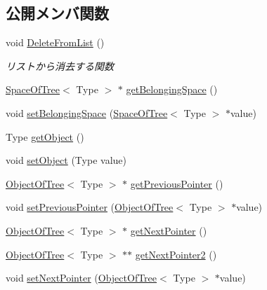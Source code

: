 \subsection*{公開メンバ関数}
\begin{DoxyCompactItemize}
\item 
void \mbox{\hyperlink{class_object_of_tree_a1356595b29749ca4555ca61a5bb30388}{Delete\+From\+List}} ()
\begin{DoxyCompactList}\small\item\em リストから消去する関数 \end{DoxyCompactList}\item 
\mbox{\hyperlink{class_space_of_tree}{Space\+Of\+Tree}}$<$ Type $>$ $\ast$ \mbox{\hyperlink{class_object_of_tree_a94c5724ddb841da0bb31ab6ae63df304}{get\+Belonging\+Space}} ()
\item 
void \mbox{\hyperlink{class_object_of_tree_a21dc9105d1a5a0d045dc43894bba3c1c}{set\+Belonging\+Space}} (\mbox{\hyperlink{class_space_of_tree}{Space\+Of\+Tree}}$<$ Type $>$ $\ast$value)
\item 
Type \mbox{\hyperlink{class_object_of_tree_a28214e15fffb72cb50b764e2f3ac863d}{get\+Object}} ()
\item 
void \mbox{\hyperlink{class_object_of_tree_aae14cb0e8ac8b701de737c547a1d3b8c}{set\+Object}} (Type value)
\item 
\mbox{\hyperlink{class_object_of_tree}{Object\+Of\+Tree}}$<$ Type $>$ $\ast$ \mbox{\hyperlink{class_object_of_tree_a02b74f20b90ec53dbae2d18648a9d5d1}{get\+Previous\+Pointer}} ()
\item 
void \mbox{\hyperlink{class_object_of_tree_aa0ec8f6f61eb41f346796141e8ec38d5}{set\+Previous\+Pointer}} (\mbox{\hyperlink{class_object_of_tree}{Object\+Of\+Tree}}$<$ Type $>$ $\ast$value)
\item 
\mbox{\hyperlink{class_object_of_tree}{Object\+Of\+Tree}}$<$ Type $>$ $\ast$ \mbox{\hyperlink{class_object_of_tree_a596be7ee8c6e26a104bed5d26f7cf54e}{get\+Next\+Pointer}} ()
\item 
\mbox{\hyperlink{class_object_of_tree}{Object\+Of\+Tree}}$<$ Type $>$ $\ast$$\ast$ \mbox{\hyperlink{class_object_of_tree_a1b5839c677aa3c678733c1aa03d4f00f}{get\+Next\+Pointer2}} ()
\item 
void \mbox{\hyperlink{class_object_of_tree_a44fb225ed189197bcdfe23dcd2a7fe28}{set\+Next\+Pointer}} (\mbox{\hyperlink{class_object_of_tree}{Object\+Of\+Tree}}$<$ Type $>$ $\ast$value)
\end{DoxyCompactItemize}
